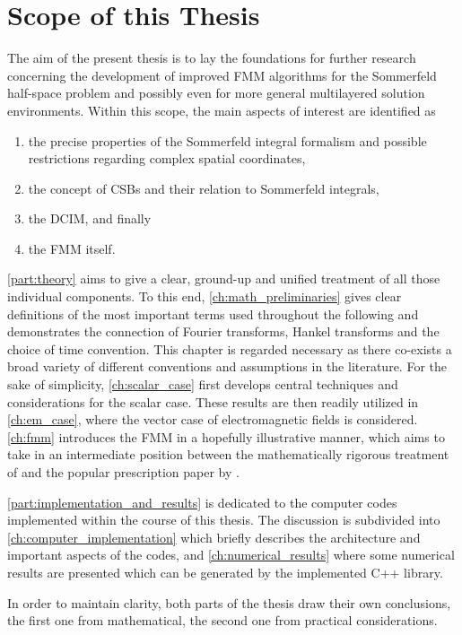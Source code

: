 \section{Scope of this Thesis}
\label{sec:scope_of_this_thesis}

The aim of the present thesis is to lay the foundations for further research
concerning the development of improved \ac{FMM} algorithms for the Sommerfeld
half-space problem and possibly even for more general multilayered solution
environments.
Within this scope, the main aspects of interest are identified as
\begin{enumerate}
	\item the precise properties of the Sommerfeld integral formalism and
	possible restrictions regarding complex spatial coordinates,
	\item the concept of \acp{CSB} and their relation to Sommerfeld integrals,
	\item the \ac{DCIM}, and finally 
	\item the \ac{FMM} itself.
\end{enumerate}

\cref{part:theory} aims to give a clear, ground-up and unified treatment of
all those individual components.
To this end, \cref{ch:math_preliminaries} gives clear definitions of the most
important terms used throughout the following and demonstrates the connection
of Fourier transforms, Hankel transforms and the choice of time convention.
This chapter is regarded necessary as there co-exists a broad variety of
different conventions and assumptions in the literature.
For the sake of simplicity, \cref{ch:scalar_case} first develops central
techniques and considerations for the scalar case.
These results are then readily utilized in \cref{ch:em_case}, where
the vector case of electromagnetic fields is considered.
\cref{ch:fmm} introduces the \ac{FMM} in a hopefully illustrative manner, which
aims to take in an intermediate position between the mathematically rigorous
treatment of \textcite{Rokhlin1993} and the popular prescription paper by
\textcite{Coifman1993}.

\cref{part:implementation_and_results} is dedicated to the computer codes 
implemented within the course of this thesis.
The discussion is subdivided into \cref{ch:computer_implementation} which
briefly describes the architecture and important aspects of the codes, and
\cref{ch:numerical_results} where some numerical results are presented which
can be generated by the implemented C++ library.

In order to maintain clarity, both parts of the thesis draw their own
conclusions, the first one from mathematical, the second one from practical
considerations.